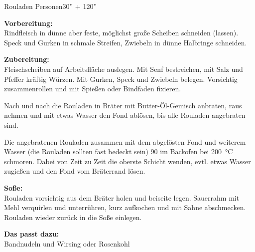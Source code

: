 \begin{MyRecipe}{Rouladen}{ Personen}{30'' + 120''}

		
		
		
		
		\textbf{Vorbereitung:}\\
		Rindfleisch in dünne aber feste, möglichst große Scheiben schneiden (lassen).\\
		Speck und Gurken in schmale Streifen, Zwiebeln in dünne Halbringe schneiden.\par\bigskip
		
		\textbf{Zubereitung:}\\
		Fleischscheiben auf Arbeitsfläche auslegen. Mit Senf bestreichen, mit Salz und Pfeffer kräftig Würzen. Mit Gurken, Speck und Zwiebeln belegen. Vorsichtig zusammenrollen und mit Spießen oder Bindfaden fixieren.\par
		Nach und nach die Rouladen in Bräter mit Butter-Öl-Gemisch anbraten, raus nehmen und mit etwas Wasser den Fond ablösen, bis alle Rouladen angebraten sind.\par
		Die angebratenen Rouladen zusammen mit dem abgelösten Fond und weiterem Wasser (die Rouladen sollten fast bedeckt sein) \SI{90}{\min} im Backofen bei \SI{200}{\degreeCelsius} schmoren. Dabei von Zeit zu Zeit die oberste Schicht wenden, evtl. etwas Wasser zugießen und den Fond vom Bräterrand lösen.\par\bigskip
		
		\textbf{Soße:}\\
		Rouladen vorsichtig aus dem Bräter holen und beiseite legen. Sauerrahm mit Mehl verquirlen und unterrühren, kurz aufkochen und mit Sahne abschmecken. Rouladen wieder zurück in die Soße einlegen.\par\bigskip
		
		\textbf{Das passt dazu:}\\
		Bandnudeln und Wirsing oder Rosenkohl
		
	\end{MyRecipe}